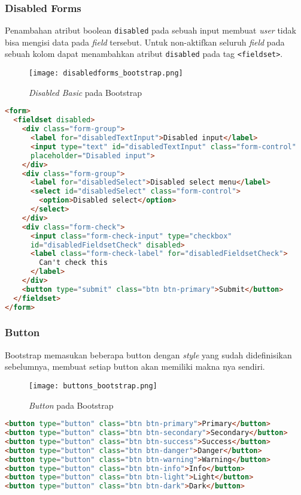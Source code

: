 \begin{itemize}
\subsubsection{Disabled Forms}
Penambahan atribut boolean \texttt{disabled} pada sebuah input membuat \textit{user} tidak bisa mengisi data pada \textit{field} tersebut. Untuk non-aktifkan seluruh \textit{field} pada sebuah kolom dapat menambahkan atribut \texttt{disabled} pada tag \texttt{<fieldset>}.
\begin{figure} [H]
	\centering  
	\texttt{[image: disabledforms\_bootstrap.png]}  
	\caption{\textit{Disabled Basic} pada Bootstrap} 
\end{figure}
\begin{lstlisting}[language=HTML, frame=single, basicstyle=\small]  
<form>
  <fieldset disabled>
    <div class="form-group">
      <label for="disabledTextInput">Disabled input</label>
      <input type="text" id="disabledTextInput" class="form-control"
      placeholder="Disabled input">
    </div>
    <div class="form-group">
      <label for="disabledSelect">Disabled select menu</label>
      <select id="disabledSelect" class="form-control">
        <option>Disabled select</option>
      </select>
    </div>
    <div class="form-check">
      <input class="form-check-input" type="checkbox" 
      id="disabledFieldsetCheck" disabled>
      <label class="form-check-label" for="disabledFieldsetCheck">
        Can't check this
      </label>
    </div>
    <button type="submit" class="btn btn-primary">Submit</button>
  </fieldset>
</form>
\end{lstlisting}
\subsubsection{Button}
Bootstrap memasukan beberapa button dengan \textit{style} yang sudah didefinisikan sebelumnya, membuat setiap button akan memiliki makna nya sendiri.
\begin{figure} [H]
	\centering  
	\texttt{[image: buttons\_bootstrap.png]}  
	\caption{\textit{Button} pada Bootstrap} 
\end{figure}
\begin{lstlisting}[language=HTML, frame=single, basicstyle=\small] 
<button type="button" class="btn btn-primary">Primary</button>
<button type="button" class="btn btn-secondary">Secondary</button>
<button type="button" class="btn btn-success">Success</button>
<button type="button" class="btn btn-danger">Danger</button>
<button type="button" class="btn btn-warning">Warning</button>
<button type="button" class="btn btn-info">Info</button>
<button type="button" class="btn btn-light">Light</button>
<button type="button" class="btn btn-dark">Dark</button>


\end{lstlisting}
\end{itemize}

